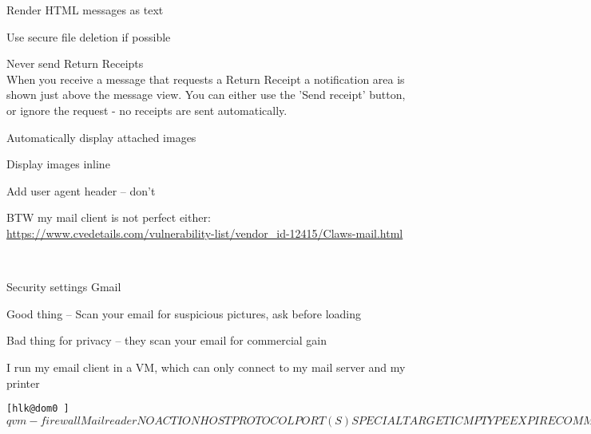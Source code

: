 \documentclass[Screen16to9,17pt]{foils}
\begin{document}
\begin{list2}
\item[\faCheck] Render HTML messages as text
\item[\faCheck] Use secure file deletion if possible
\item[\faCheck] Never send Return Receipts\\
When you receive a message that requests a Return Receipt a notification area is shown just above the message view. You can either use the 'Send receipt' button, or ignore the request - no receipts are sent automatically.
\item[\faSquareO] Automatically display attached images
\item[\faSquareO] Display images inline
\item[\faSquareO] Add user agent header -- don't
\end{list2}

BTW my mail client is not perfect either:\\{\footnotesize
\url{https://www.cvedetails.com/vulnerability-list/vendor_id-12415/Claws-mail.html}}


{~}

\begin{list2}
\item Security settings Gmail
\item Good thing -- Scan your email for suspicious pictures, ask before loading
\item Bad thing for privacy -- they scan your email for commercial gain
\end{list2}







I run my email client in a VM, which can only connect to my mail server and my printer

\begin{alltt}\footnotesize
[hlk@dom0 ~]$ qvm-firewall Mailreader
NO  ACTION  HOST             PROTOCOL  PORT(S)  SPECIAL TARGET  ICMP TYPE  EXPIRE  COMMENT
0   accept  91.102.91.22/32  tcp       993      -               -          -       -
1   accept  91.102.91.22/32  tcp       587      -               -          -       -
2   accept  10.0.42.13/32    tcp       515      -               -          -       -
3   drop    -                -         -        -               -          -       -
[hlk@dom0 ~]$
\end{alltt}
\end{document}
